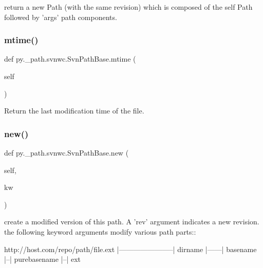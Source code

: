 \begin{DoxyVerb}return a new Path (with the same revision) which is composed
    of the self Path followed by 'args' path components.
\end{DoxyVerb}
 \mbox{\label{classpy_1_1__path_1_1svnwc_1_1_svn_path_base_af5ba59e674df682188839251ca35d9c4}} 
\subsubsection{\texorpdfstring{mtime()}{mtime()}}
{\footnotesize\ttfamily def py.\+\_\+path.\+svnwc.\+Svn\+Path\+Base.\+mtime (\begin{DoxyParamCaption}\item[{}]{self }\end{DoxyParamCaption})}

\begin{DoxyVerb}Return the last modification time of the file. \end{DoxyVerb}
 \mbox{\label{classpy_1_1__path_1_1svnwc_1_1_svn_path_base_a36e702f1bce4b04bbab99b50218659ae}} 
\subsubsection{\texorpdfstring{new()}{new()}}
{\footnotesize\ttfamily def py.\+\_\+path.\+svnwc.\+Svn\+Path\+Base.\+new (\begin{DoxyParamCaption}\item[{}]{self,  }\item[{}]{kw }\end{DoxyParamCaption})}

\begin{DoxyVerb}create a modified version of this path. A 'rev' argument
    indicates a new revision.
    the following keyword arguments modify various path parts::

      http://host.com/repo/path/file.ext
      |-----------------------|          dirname
                        |------| basename
                        |--|     purebasename
                            |--| ext
\end{DoxyVerb}
 \mbox{\label{classpy_1_1__path_1_1svnwc_1_1_svn_path_base_aefde7672dedfe51ae1a46ab75c995bba}} 
